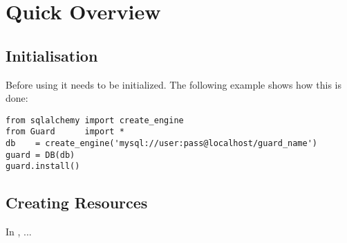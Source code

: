 

\newpage
\section{Quick Overview}
\subsection{Initialisation}

Before using \product it needs to be initialized. 
The following example shows how this is done:

\begin{lstlisting}
from sqlalchemy import create_engine
from Guard      import *
db    = create_engine('mysql://user:pass@localhost/guard_name')
guard = DB(db)
guard.install()
\end{lstlisting}


\subsection{\label{intro:resources}Creating Resources}

In \product, ...



